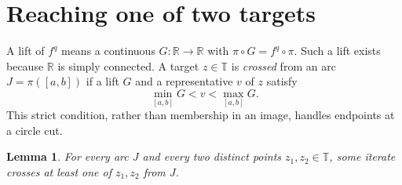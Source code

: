 \documentclass[11pt]{article}
\newtheorem{lemma}[theorem]{Lemma}
\newcommand{\T}{\mathbb T}
\begin{document}
\section{Reaching one of two targets}
A lift of $f^q$ means a continuous $G:\mathbb R\to\mathbb R$ with $\pi\circ G=f^q\circ\pi$. Such a lift exists because $\mathbb R$ is simply connected. A target $z\in\T$ is \emph{crossed} from an arc $J=\pi([a,b])$ if a lift $G$ and a representative $v$ of $z$ satisfy
\[
 \min_{[a,b]}G<v<\max_{[a,b]}G.
\]
This strict condition, rather than membership in an image, handles endpoints at a circle cut.

\begin{lemma}\label{lem:access}
For every arc $J$ and every two distinct points $z_1,z_2\in\T$, some iterate crosses at least one of $z_1,z_2$ from $J$.
\end{lemma}
\end{document}
